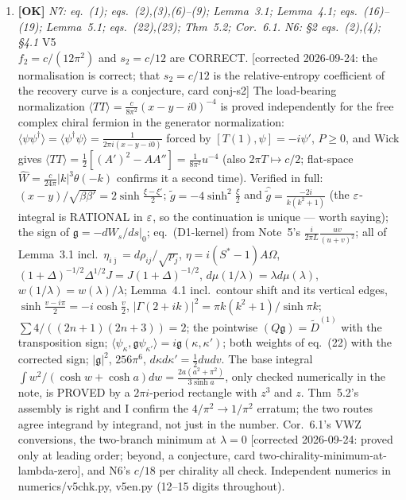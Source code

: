 \documentclass[11pt]{article}
\begin{document}
\begin{enumerate}[leftmargin=1.6em,itemsep=6pt]
\item \textbf{[OK]} \emph{N7: eq.\ (1); eqs.\ (2),(3),(6)--(9); Lemma~3.1; Lemma~4.1; eqs.\ (16)--(19); Lemma~5.1; eqs.\ (22),(23); Thm~5.2; Cor.\ 6.1. N6: \S2 eqs.\ (2),(4); \S4.1} \hfill\textsc{V5}\\ \(f_2=c/(12\pi^2)\) and \(s_2=c/12\) are CORRECT. [corrected 2026-09-24: the normalisation is correct; that \(s_2=c/12\) is the relative-entropy coefficient of the recovery curve is a conjecture, card conj-s2] The load-bearing normalization \(\langle TT\rangle=\frac c{8\pi^2}(x-y-i0)^{-4}\) is proved independently for the free complex chiral fermion in the generator normalization: \(\langle\psi\psi^\dagger\rangle=\langle\psi^\dagger\psi\rangle=\frac1{2\pi i(x-y-i0)}\) forced by \([T(1),\psi]=-i\psi'\), \(P\ge0\), and Wick gives \(\langle TT\rangle=\frac12[(A')^2-AA'']=\frac1{8\pi^2}u^{-4}\) (also \(2\pi T\mapsto c/2\); flat-space \(\widehat W=\frac c{24\pi}|k|^3\theta(-k)\) confirms it a second time). Verified in full: \((x-y)/\sqrt{\beta\beta'}=2\sinh\frac{\xi-\xi'}2\); \(\widetilde g=-4\sinh^2\frac\xi2\) and \(\widehat{\widetilde g}=\frac{-2i}{k(k^2+1)}\) (the \(\varepsilon\)-integral is RATIONAL in \(\varepsilon\), so the continuation is unique --- worth saying); the sign of \(\mathfrak g=-dW_s/ds|_0\); eq.\ (D1-kernel) from Note~5's \(\frac i{2\pi L}\frac{uv}{(u+v)^2}\); all of Lemma~3.1 incl.\ \(\eta_{i\bar\jmath}=d\rho_{ij}/\sqrt{p_j}\), \(\eta=i(S^*-1)A\Omega\), \((1+\Delta)^{-1/2}\Delta^{1/2}J=J(1+\Delta)^{-1/2}\), \(d\mu(1/\lambda)=\lambda d\mu(\lambda)\), \(w(1/\lambda)=w(\lambda)/\lambda\); Lemma~4.1 incl.\ contour shift and its vertical edges, \(\sinh\frac{v-i\pi}2=-i\cosh\frac v2\), \(|\Gamma(2+ik)|^2=\pi k(k^2+1)/\sinh\pi k\); \(\sum4/((2n+1)(2n+3))=2\); the pointwise \((Q\mathfrak g)=\widetilde D^{(1)}\) with the transposition sign; \(\langle\psi_\kappa,\mathfrak g\psi_{\kappa'}\rangle=i\mathfrak g(\kappa,\kappa')\); both weights of eq.\ (22) with the corrected sign; \(|\mathfrak g|^2\), \(256\pi^6\), \(d\kappa d\kappa'=\frac12dudv\). The base integral \(\int w^2/(\cosh w+\cosh a)dw=\frac{2a(a^2+\pi^2)}{3\sinh a}\), only checked numerically in the note, is PROVED by a \(2\pi i\)-period rectangle with \(z^3\) and \(z\). Thm~5.2's assembly is right and I confirm the \(4/\pi^2\to1/\pi^2\) erratum; the two routes agree integrand by integrand, not just in the number. Cor.\ 6.1's VWZ conversions, the two-branch minimum at \(\lambda=0\) [corrected 2026-09-24: proved only at leading order; beyond, a conjecture, card two-chirality-minimum-at-lambda-zero], and N6's \(c/18\) per chirality all check. Independent numerics in numerics/v5chk.py, v5en.py (12--15 digits throughout).

\end{enumerate}
\end{document}
